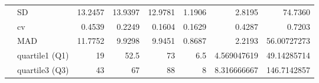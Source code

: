 \begin{table}[ht]
\begin{adjustbox}{width = \textwidth, center}
\begin{tabular}{|cl|r|r|r|r|r|r|}
        \multicolumn{1}{|c|}{}                                         & \cellcolor[HTML]{CFE2F3}SD                                                   & 13.2457                                          & 13.9397                                                  & 12.9781                                                 & 1.1906                                                           & 2.8195                                                                       & 74.7360                                                                          \\ \cline{2-8} 
        \multicolumn{1}{|c|}{}                                         & \cellcolor[HTML]{CFE2F3}cv                                                   & 0.4539                                           & 0.2249                                                   & 0.1604                                                  & 0.1629                                                           & 0.4287                                                                       & 0.7203                                                                           \\ \cline{2-8} 
        \multicolumn{1}{|c|}{}                                         & \cellcolor[HTML]{CFE2F3}MAD                                                  & 11.7752                                          & 9.9298                                                   & 9.9451                                                  & 0.8687                                                           & 2.2193                                                                       & 56.00727273                                                                      \\ \cline{2-8} 
        \multicolumn{1}{|c|}{}                                         & quartile1 (Q1)                                                               & 19                                               & 52.5                                                     & 73                                                      & 6.5                                                              & 4.569047619                                                                  & 49.14285714                                                                      \\ \cline{2-8} 
        \multicolumn{1}{|c|}{}                                         & quartile3 (Q3)                                                               & 43                                               & 67                                                       & 88                                                      & 8                                                                & 8.316666667                                                                  & 146.7142857                                                                      \\ \cline{2-8} 

\end{tabular}
\end{adjustbox}
\end{table}
